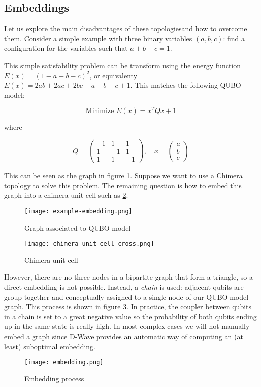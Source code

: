 \subsection{Embeddings}
\label{sec:embeddings}

Let us explore the main disadvantages of these topologiesand how to overcome them. Consider a simple example with three binary variables $(a, b, c)$: find a configuration for the variables such that $a + b + c = 1$.

This simple satisfability problem can be transform using the energy function $E(x) = (1 - a - b - c)^2$, or equivalenty $E(x) = 2ab + 2ac + 2bc - a - b - c + 1$. This matches the following QUBO model:

$$ \text{Minimize } E(x) = x^T Q x + 1$$

where

$$
Q = 
\left(
\begin{array}{ccc}
	-1 & 1 & 1  \\
	1 & -1 & 1  \\
	1 & 1 & -1
\end{array}
\right), \quad
x = 
\left(
\begin{array}{c}
a  \\
b  \\
c
\end{array}
\right)
$$

This can be seen as the graph in figure \ref{fig:example-embedding}. Suppose we want to use a Chimera topology to solve this problem. The remaining question is how to embed this graph into a chimera unit cell such as \ref{fig:chimera-unit-cell-cross}. 

\begin{figure}[H]
	\texttt{[image: example-embedding.png]}
	\centering
	\caption{Graph associated to QUBO model \cite{DWaveDoc-MinorEmbedding}}
	\label{fig:example-embedding}
\end{figure}

\begin{figure}[H]
	\texttt{[image: chimera-unit-cell-cross.png]}
	\centering
	\caption{Chimera unit cell \cite{DWaveDoc-MinorEmbedding}}
	\label{fig:chimera-unit-cell-cross}
\end{figure}

However, there are no three nodes in a bipartite graph that form a triangle, so a direct embedding is not possible. Instead, a \emph{chain} is used: adjacent qubits are group together and conceptually assigned to a single node of our QUBO model graph. This process is shown in figure \ref{fig:embedding}. In practice, the coupler between qubits in a chain is set to a great negative value so the probability of both qubits ending up in the same state is really high. In most complex cases we will not manually embed a graph since D-Wave provides an automatic way of computing an (at least) suboptimal embedding.

\begin{figure}[H]
	\texttt{[image: embedding.png]}
	\centering
	\caption{Embedding process \cite{DWaveDoc-MinorEmbedding}}
	\label{fig:embedding}
\end{figure}
